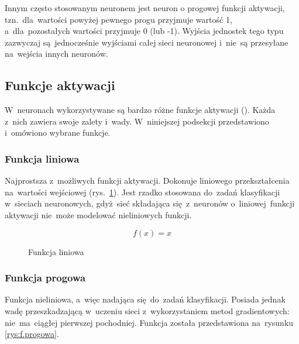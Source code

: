 Innym często stosowanym neuronem jest neuron o progowej funkcji aktywacji, tzn.~dla~wartości powyżej pewnego
progu przyjmuje wartość 1, a~dla~pozostałych wartości przyjmuje 0 (lub -1). Wyjścia jednostek tego typu
zazwyczaj są~jednocześnie wyjściami całej sieci neuronowej i~nie~są przesyłane na~wejścia innych neuronów.

\subsection{Funkcje aktywacji}
W~neuronach wykorzystywane są bardzo różne funkcje aktywacji (\cite{activation-functions}). Każda z~nich zawiera swoje
zalety i~wady. W~niniejszej podsekcji przedstawiono i~omówiono wybrane funkcje.

\subsubsection{Funkcja liniowa}
Najprostsza z~możliwych funkcji aktywacji. Dokonuje liniowego przekształcenia na~wartości wejściowej
(rys.~\ref{rys:f-liniowa}). Jest rzadko stosowana do~zadań klasyfikacji w~sieciach neuronowych, gdyż~sieć składająca
się~z~neuronów o~liniowej~funkcji aktywacji nie~może modelować nieliniowych funkcji.

\begin{minipage}[t]{\textwidth}
\begin{equation}
f(x)=x
\end{equation}
\begin{figure}[H]
    \centering
    \caption{Funkcja liniowa}
    \label{rys:f-liniowa}

\end{figure}
\end{minipage}

\subsubsection{Funkcja progowa}
Funkcja nieliniowa, a~więc nadająca się~do~zadań klasyfikacji. Posiada jednak wadę przeszkadzającą w~uczeniu sieci
z~wykorzystaniem metod gradientowych: nie~ma~ciągłej pierwszej pochodniej. Funkcja została przedstawiona na~rysunku
\ref{rys:f.progowa}.

